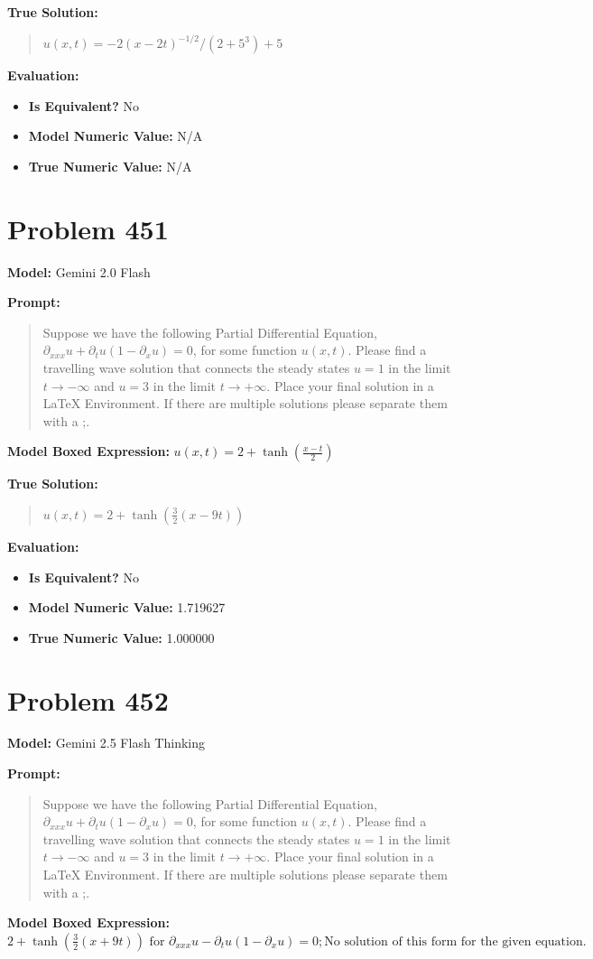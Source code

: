\documentclass{article}
\begin{document}
\textbf{True Solution:}
\begin{quote}
$u(x,t)=-2(x-2t)^{-1/2}/(2+5^3)+5$
\end{quote}

\textbf{Evaluation:}
\begin{itemize}
\item \textbf{Is Equivalent?} No
\item \textbf{Model Numeric Value:} N/A
\item \textbf{True Numeric Value:} N/A
\end{itemize}
\vspace{1cm}
\section*{Problem 451}
\textbf{Model:} Gemini 2.0 Flash

\textbf{Prompt:}
\begin{quote}
Suppose we have the following Partial Differential Equation, $\partial_{xxx}u + \partial_{t}u(1-\partial_xu)= 0$, for some function $u(x,t)$. Please find a travelling wave solution that connects the steady states $u = 1$ in the limit $t \rightarrow -\infty $ and $u = 3$ in the limit $t \rightarrow +\infty$. Place your final solution in a $\boxed{}$ LaTeX Environment. If there are multiple solutions please separate them with a ;.
\end{quote}
\textbf{Model Boxed Expression:} $u(x,t) = 2 + \tanh\left(\frac{x-t}{2}\right)$

\textbf{True Solution:}
\begin{quote}
$u(x,t) = 2+\tanh(\frac{3}{2}(x-9t))$
\end{quote}

\textbf{Evaluation:}
\begin{itemize}
\item \textbf{Is Equivalent?} No
\item \textbf{Model Numeric Value:} 1.719627
\item \textbf{True Numeric Value:} 1.000000
\end{itemize}
\vspace{1cm}
\section*{Problem 452}
\textbf{Model:} Gemini 2.5 Flash Thinking

\textbf{Prompt:}
\begin{quote}
Suppose we have the following Partial Differential Equation, $\partial_{xxx}u + \partial_{t}u(1-\partial_xu)= 0$, for some function $u(x,t)$. Please find a travelling wave solution that connects the steady states $u = 1$ in the limit $t \rightarrow -\infty $ and $u = 3$ in the limit $t \rightarrow +\infty$. Place your final solution in a $\boxed{}$ LaTeX Environment. If there are multiple solutions please separate them with a ;.
\end{quote}
\textbf{Model Boxed Expression:} $2 + \tanh\left(\frac{3}{2}(x+9t)\right) \text{ for } \partial_{xxx}u - \partial_{t}u(1-\partial_xu)= 0; \text{No solution of this form for the given equation.}$
\end{document}
